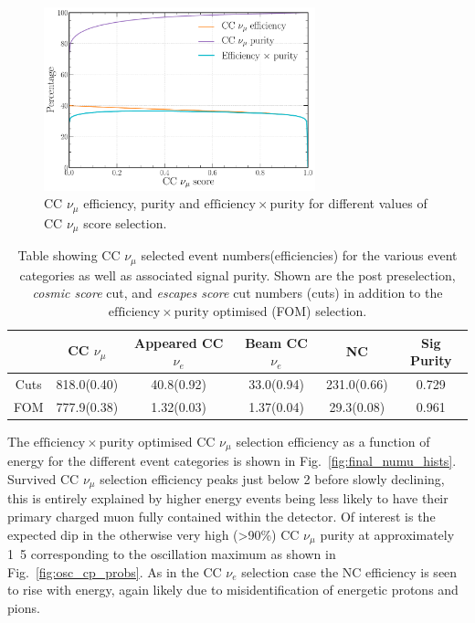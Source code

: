 \begin{figure} %
    \includegraphics[width=0.7\textwidth]{diagrams/6-cvn/chipsnet/final_numu_eff_curves.pdf}
    \caption[CC $\nu_{\mu}$ efficiency, purity and $\mathrm{efficiency}\times\mathrm{purity}$.]
    {CC $\nu_{\mu}$ efficiency, purity and $\mathrm{efficiency}\times\mathrm{purity}$ for
        different values of CC $\nu_{\mu}$ score selection.}
    \label{fig:final_numu_eff_curves}
\end{figure}

\begin{table}
    \begin{tabular}{cccccc}
             & CC $\nu_{\mu}$ & Appeared CC $\nu_{e}$ & Beam CC $\nu_{e}$ & NC          & Sig Purity \\
        \midrule
        Cuts & 818.0(0.40)    & 40.8(0.92)            & 33.0(0.94)        & 231.0(0.66) & 0.729      \\
        FOM  & 777.9(0.38)    & 1.32(0.03)            & 1.37(0.04)        & 29.3(0.08)  & 0.961      \\
    \end{tabular}
    \caption[Table showing CC $\nu_{\mu}$ selected event numbers, efficiencies and signal purity.]
    {Table showing CC $\nu_{\mu}$ selected event numbers(efficiencies) for the various event
        categories as well as associated signal purity. Shown are the post preselection,
        \emph{cosmic score} cut, and \emph{escapes score} cut numbers (cuts) in addition to the
        $\mathrm{efficiency}\times\mathrm{purity}$ optimised (FOM) selection.}
    \label{tab:numu_selection}
\end{table}

The $\mathrm{efficiency}\times\mathrm{purity}$ optimised CC $\nu_{\mu}$ selection efficiency as a
function of energy for the different event categories is shown in Fig.~\ref{fig:final_numu_hists}.
Survived CC $\nu_{\mu}$ selection efficiency peaks just below \unit{2}{\GeV} before slowly
declining, this is entirely explained by higher energy events being less likely to have their
primary charged muon fully contained within the detector. Of interest is the expected dip in the
otherwise very high (>90\%) CC $\nu_{\mu}$ purity at approximately \unit{1.5}{\GeV} corresponding
to the oscillation maximum as shown in Fig.~\ref{fig:osc_cp_probs}. As in the CC $\nu_{e}$
selection case the NC efficiency is seen to rise with energy, again likely due to
misidentification of energetic protons and pions.

